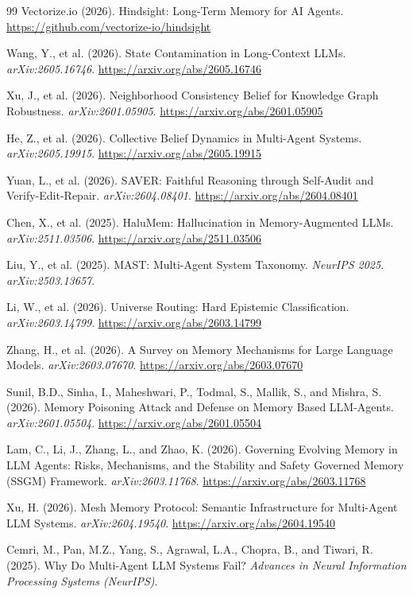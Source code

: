 \documentclass[11pt,letterpaper]{article}
\begin{document}
\begin{thebibliography}{99}
Vectorize.io (2026).
\newblock Hindsight: Long-Term Memory for AI Agents.
\newblock \url{https://github.com/vectorize-io/hindsight}

Wang, Y., et al. (2026).
\newblock State Contamination in Long-Context LLMs.
\newblock \textit{arXiv:2605.16746}. \url{https://arxiv.org/abs/2605.16746}

Xu, J., et al. (2026).
\newblock Neighborhood Consistency Belief for Knowledge Graph Robustness.
\newblock \textit{arXiv:2601.05905}. \url{https://arxiv.org/abs/2601.05905}

He, Z., et al. (2026).
\newblock Collective Belief Dynamics in Multi-Agent Systems.
\newblock \textit{arXiv:2605.19915}. \url{https://arxiv.org/abs/2605.19915}

Yuan, L., et al. (2026).
\newblock SAVER: Faithful Reasoning through Self-Audit and Verify-Edit-Repair.
\newblock \textit{arXiv:2604.08401}. \url{https://arxiv.org/abs/2604.08401}

Chen, X., et al. (2025).
\newblock HaluMem: Hallucination in Memory-Augmented LLMs.
\newblock \textit{arXiv:2511.03506}. \url{https://arxiv.org/abs/2511.03506}

Liu, Y., et al. (2025).
\newblock MAST: Multi-Agent System Taxonomy.
\newblock \textit{NeurIPS 2025}. \textit{arXiv:2503.13657}.

Li, W., et al. (2026).
\newblock Universe Routing: Hard Epistemic Classification.
\newblock \textit{arXiv:2603.14799}. \url{https://arxiv.org/abs/2603.14799}

Zhang, H., et al. (2026).
\newblock A Survey on Memory Mechanisms for Large Language Models.
\newblock \textit{arXiv:2603.07670}. \url{https://arxiv.org/abs/2603.07670}

Sunil, B.D., Sinha, I., Maheshwari, P., Todmal, S., Mallik, S., and Mishra, S. (2026).
\newblock Memory Poisoning Attack and Defense on Memory Based LLM-Agents.
\newblock \textit{arXiv:2601.05504}. \url{https://arxiv.org/abs/2601.05504}

Lam, C., Li, J., Zhang, L., and Zhao, K. (2026).
\newblock Governing Evolving Memory in LLM Agents: Risks, Mechanisms, and the Stability and Safety Governed Memory (SSGM) Framework.
\newblock \textit{arXiv:2603.11768}. \url{https://arxiv.org/abs/2603.11768}

Xu, H. (2026).
\newblock Mesh Memory Protocol: Semantic Infrastructure for Multi-Agent LLM Systems.
\newblock \textit{arXiv:2604.19540}. \url{https://arxiv.org/abs/2604.19540}

Cemri, M., Pan, M.Z., Yang, S., Agrawal, L.A., Chopra, B., and Tiwari, R. (2025).
\newblock Why Do Multi-Agent LLM Systems Fail?
\newblock \textit{Advances in Neural Information Processing Systems (NeurIPS)}.

\end{thebibliography}
\end{document}
